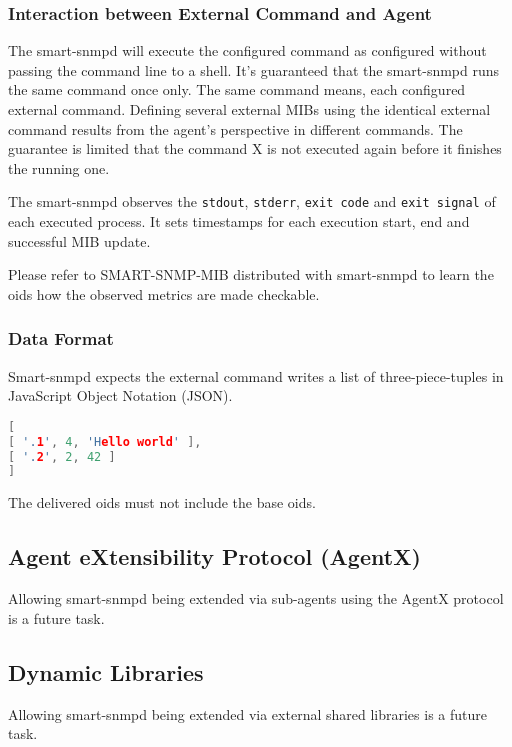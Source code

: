 \subsubsection{Interaction between External Command and Agent}

The smart-snmpd will execute the configured command as configured without
passing the command line to a shell. It's guaranteed that the smart-snmpd
runs the same command once only. The same command means, each configured
external command. Defining several external MIBs using the identical
external command results from the agent's perspective in different commands.
The guarantee is limited that the command X is not executed again before
it finishes the running one.

The smart-snmpd observes the \texttt{stdout}, \texttt{stderr},
\texttt{exit code} and \texttt{exit signal} of each executed process.
It sets timestamps for each execution start, end and successful MIB update.

Please refer to SMART-SNMP-MIB distributed with smart-snmpd to learn the
oids how the observed metrics are made checkable.

\subsubsection{Data Format}

Smart-snmpd expects the external command writes a list of three-piece-tuples
in JavaScript Object Notation (JSON).

\begin{lstlisting}[language=C++,inputencoding=latin9,frame=shadowbox]
[
[ '.1', 4, 'Hello world' ],
[ '.2', 2, 42 ]
]
\end{lstlisting}

The delivered oids must not include the base oids.

\subsection{Agent eXtensibility Protocol (AgentX)}

Allowing smart-snmpd being extended via sub-agents using the AgentX protocol
is a future task.

\subsection{Dynamic Libraries}

Allowing smart-snmpd being extended via external shared libraries
is a future task.


